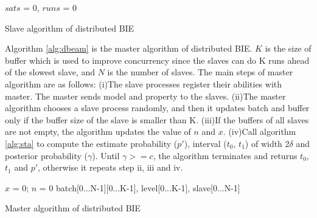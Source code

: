 \begin{algorithm}[t]
{}
$sats$ = 0, $runs$ = 0\;
\caption{Slave algorithm of distributed BIE}
\label{alg:dbeas}
\end{algorithm}

Algorithm \ref{alg:dbeam} is the master algorithm of distributed BIE. $K$ is the size of buffer which is used to improve concurrency since the slaves can do K runs ahead of the slowest slave, and $N$ is the number of slaves. The main steps of master algorithm are as follows: (i)The slave processes register their abilities with master. The master sends model and property to the slaves. (ii)The master algorithm chooses a slave process randomly, and then it updates batch and buffer only if the buffer size of the slave is smaller than K. (iii)If the buffers of all slaves are not empty, the algorithm updates the value of $n$ and $x$. (iv)Call algorithm \ref{alg:sta} to compute the estimate probability ($p'$), interval ($t_0$, $t_1$) of width 2$\delta$ and posterior probability ($\gamma$). Until $\gamma >= c$, the algorithm terminates and returns $t_0$, $t_1$ and $p'$, otherwise it repeats step ii, iii and iv.

\begin{algorithm}[t]
{}
$x$ = 0; $n$ = 0\;
batch[0...N-1][0...K-1], level[0...K-1], slave[0...N-1]\;
\caption{Master algorithm of distributed BIE}
\label{alg:dbeam}
\end{algorithm}


